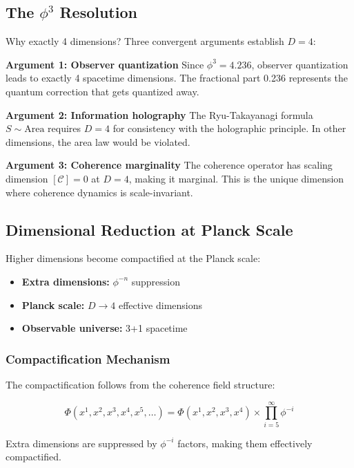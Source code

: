 \documentclass[11pt]{article}
\theoremstyle{definition}
\newcommand{\goldenratio}{\phi}
\newcommand{\coherence}{\mathcal{C}}
\begin{document}
\subsection{The $\goldenratio^3$ Resolution}

Why exactly 4 dimensions? Three convergent arguments establish $D = 4$:

\textbf{Argument 1: Observer quantization}
Since $\goldenratio^3 = 4.236$, observer quantization leads to exactly 4 spacetime dimensions. The fractional part 0.236 represents the quantum correction that gets quantized away.

\textbf{Argument 2: Information holography}
The Ryu-Takayanagi formula $S \sim \text{Area}$ requires $D = 4$ for consistency with the holographic principle. In other dimensions, the area law would be violated.

\textbf{Argument 3: Coherence marginality}
The coherence operator has scaling dimension $[\coherence] = 0$ at $D = 4$, making it marginal. This is the unique dimension where coherence dynamics is scale-invariant.

\subsection{Dimensional Reduction at Planck Scale}

Higher dimensions become compactified at the Planck scale:

\begin{itemize}
\item \textbf{Extra dimensions:} $\goldenratio^{-n}$ suppression
\item \textbf{Planck scale:} $D \to 4$ effective dimensions
\item \textbf{Observable universe:} 3+1 spacetime
\end{itemize}

\subsubsection{Compactification Mechanism}

The compactification follows from the coherence field structure:

\begin{equation}
\Phi(x^1, x^2, x^3, x^4, x^5, \ldots) = \Phi(x^1, x^2, x^3, x^4) \times \prod_{i=5}^{\infty} \goldenratio^{-i}
\end{equation}

Extra dimensions are suppressed by $\goldenratio^{-i}$ factors, making them effectively compactified.
\end{document}
